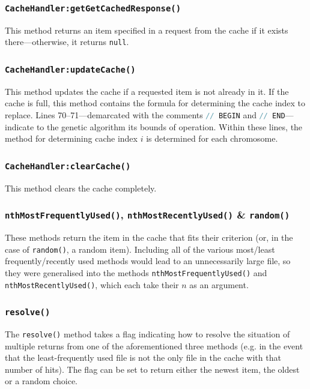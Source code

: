 \documentclass[compsoc,12pt,a4paper]{IEEEtran}
\begin{document}
			\subsubsection{\lstinline|CacheHandler:getGetCachedResponse()|}
			
				This method returns an item specified in a request from the cache if it exists there---otherwise, it returns \lstinline|null|.

			\subsubsection{\lstinline|CacheHandler:updateCache()|}
				
				This method updates the cache if a requested item is not already in it. If the cache is full, this method contains the formula for determining the cache index to replace. Lines 70--71---demarcated with the comments \lstinline[language=Java]|// BEGIN| and \lstinline[language=Java]|// END|---indicate to the genetic algorithm its bounds of operation. Within these lines, the method for determining cache index $i$ is determined for each chromosome.
			
			\subsubsection{\lstinline|CacheHandler:clearCache()|}
			
				This method clears the cache completely.
			
			\subsubsection{\lstinline|nthMostFrequentlyUsed()|, \lstinline|nthMostRecentlyUsed()| \& \lstinline|random()|}
			
				These methods return the item in the cache that fits their criterion (or, in the case of \lstinline|random()|, a random item). Including all of the various most/least frequently/recently used methods would lead to an unnecessarily large file, so they were generalised into the methods \lstinline|nthMostFrequentlyUsed()| and \lstinline|nthMostRecentlyUsed()|, which each take their $n$ as an argument.
				
			\subsubsection{\lstinline|resolve()|}
			
				The \lstinline|resolve()| method takes a flag indicating how to resolve the situation of multiple returns from one of the aforementioned three methods (e.g. in the event that the least-frequently used file is not the only file in the cache with that number of hits). The flag can be set to return either the newest item, the oldest or a random choice.
			
\end{document}
